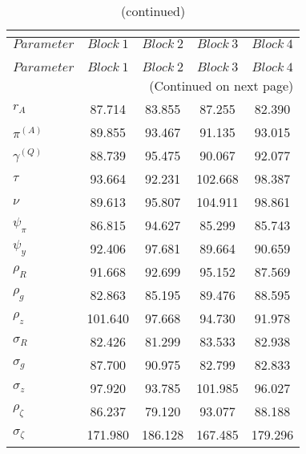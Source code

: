  
\begin{center}
\begin{longtable}{lcccc} 
\caption{MCMC Inefficiency factors per block}\\
 \label{Table:MCMC_inefficiency_factors}\\
\toprule 
$Parameter         $	 & 	 $     Block~1$	 & 	 $     Block~2$	 & 	 $     Block~3$	 & 	 $     Block~4$\\
\midrule \endfirsthead 
\caption{(continued)}\\
 \toprule \\ 
$Parameter         $	 & 	 $     Block~1$	 & 	 $     Block~2$	 & 	 $     Block~3$	 & 	 $     Block~4$\\
\midrule \endhead 
\midrule \multicolumn{5}{r}{(Continued on next page)} \\ \bottomrule \endfoot 
\bottomrule \endlastfoot 
$ {r_{A}}          $	 & 	      87.714	 & 	      83.855	 & 	      87.255	 & 	      82.390 \\ 
$ {\pi^{(A)}}      $	 & 	      89.855	 & 	      93.467	 & 	      91.135	 & 	      93.015 \\ 
$ {\gamma^{(Q)}}   $	 & 	      88.739	 & 	      95.475	 & 	      90.067	 & 	      92.077 \\ 
$ {\tau}           $	 & 	      93.664	 & 	      92.231	 & 	     102.668	 & 	      98.387 \\ 
$ {\nu}            $	 & 	      89.613	 & 	      95.807	 & 	     104.911	 & 	      98.861 \\ 
$ {\psi_\pi}       $	 & 	      86.815	 & 	      94.627	 & 	      85.299	 & 	      85.743 \\ 
$ {\psi_y}         $	 & 	      92.406	 & 	      97.681	 & 	      89.664	 & 	      90.659 \\ 
$ {\rho_R}         $	 & 	      91.668	 & 	      92.699	 & 	      95.152	 & 	      87.569 \\ 
$ {\rho_{g}}       $	 & 	      82.863	 & 	      85.195	 & 	      89.476	 & 	      88.595 \\ 
$ {\rho_z}         $	 & 	     101.640	 & 	      97.668	 & 	      94.730	 & 	      91.978 \\ 
$ {\sigma_R}       $	 & 	      82.426	 & 	      81.299	 & 	      83.533	 & 	      82.938 \\ 
$ {\sigma_{g}}     $	 & 	      87.700	 & 	      90.975	 & 	      82.799	 & 	      82.833 \\ 
$ {\sigma_z}       $	 & 	      97.920	 & 	      93.785	 & 	     101.985	 & 	      96.027 \\ 
$ {\rho_\zeta}     $	 & 	      86.237	 & 	      79.120	 & 	      93.077	 & 	      88.188 \\ 
$ {\sigma_\zeta}   $	 & 	     171.980	 & 	     186.128	 & 	     167.485	 & 	     179.296 \\ 
\end{longtable}
 \end{center}
